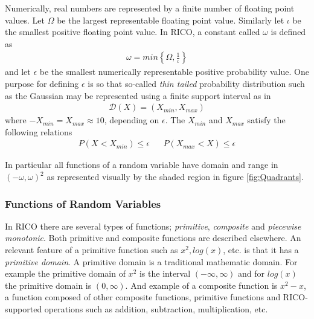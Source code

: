 Numerically, real numbers are represented by a finite number of floating point values. Let $\Omega$ be the largest representable floating point value. Similarly let $\iota$ be the smallest positive floating point value. In RICO, a constant called $\omega$ is defined as
\begin{align}
\omega = min \left\{\Omega, \frac{1}{\iota} \right\}
\label{constant:omega}
\end{align}
and let $\epsilon$ be the smallest numerically representable positive probability value. One purpose for defining $\epsilon$ is so that so-called \emph{thin tailed} probability distribution such as the Gaussian may be represented using a finite support interval as in
\begin{align*}
\mathcal{D}(X) = (X_{min}, X_{max})
\end{align*}
where $-X_{min} = X_{max} \approx 10$, depending on $\epsilon$. The $X_{min}$ and $X_{max}$ satisfy the following relations
\begin{align*}
P(X < X_{min}) \le \epsilon && P(X_{max} < X) \le \epsilon
\end{align*}

In particular all functions of a random variable have domain and range in $(-\omega, \omega)^2$ as represented visually by the shaded region in figure \ref{fig:Quadrants}.

\subsubsection{Functions of Random Variables}

In RICO there are several types of functions; \emph{primitive}, \emph{composite} and \emph{piecewise monotonic}. Both primitive and composite functions are described elsewhere. An relevant feature of a primitive function such as $x^2, log(x)$, etc. is that it has a \emph{primitive domain}. A primitive domain is a traditional mathematic domain. For example the primitive domain of $x^2$ is the interval $(-\infty, \infty)$ and for $log(x)$ the primitive domain is $(0,\infty)$. And example of a composite function is $x^2-x$, a function composed of other composite functions, primitive functions and RICO-supported operations such as addition, subtraction, multiplication, etc.

